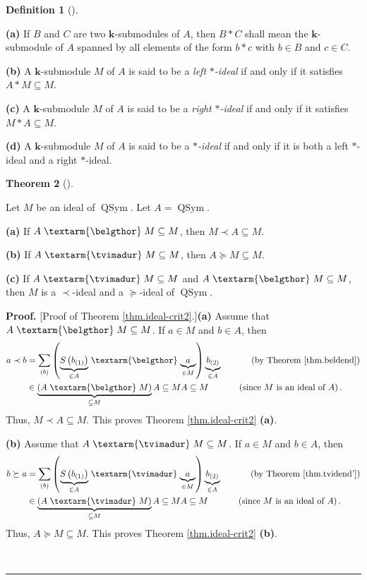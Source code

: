 \documentclass[numbers=enddot,12pt,final,onecolumn,notitlepage]{scrartcl}%
\theoremstyle{definition}
\newtheorem{theo}{Theorem}[section]
\newenvironment{theorem}[1][]
{\begin{theo}[#1]\begin{leftbar}}
{\end{leftbar}\end{theo}}
\newtheorem{defi}[theo]{Definition}
\newenvironment{definition}[1][]
{\begin{defi}[#1]\begin{leftbar}}
{\end{leftbar}\end{defi}}
\newenvironment{proof}[1][Proof]{\noindent\textbf{#1.} }{\ \rule{0.5em}{0.5em}}
\newenvironment{verlong}{}{}
\newcommand{\tvi}{\left. \textarm{\tvimadur} \right.}
\newcommand{\bel}{\left. \textarm{\belgthor} \right.}
\let\sumnonlimits\sum
\renewcommand{\sum}{\sumnonlimits\limits}
\begin{document}
\begin{verlong}
\begin{definition}
\textbf{(a)} If $B$ and $C$ are two $\mathbf{k}$-submodules of $A$, then
$B\ast C$ shall mean the $\mathbf{k}$-submodule of $A$ spanned by all elements
of the form $b\ast c$ with $b\in B$ and $c\in C$.

\textbf{(b)} A $\mathbf{k}$-submodule $M$ of $A$ is said to be a \textit{left
}$\ast$\textit{-ideal} if and only if it satisfies $A\ast M\subseteq M$.

\textbf{(c)} A $\mathbf{k}$-submodule $M$ of $A$ is said to be a \textit{right
}$\ast$\textit{-ideal} if and only if it satisfies $M\ast A\subseteq M$.

\textbf{(d)} A $\mathbf{k}$-submodule $M$ of $A$ is said to be a\textit{
}$\ast$\textit{-ideal} if and only if it is both a left $\ast$-ideal and a
right $\ast$-ideal.
\end{definition}

\begin{theorem}
\label{thm.ideal-crit2}Let $M$ be an ideal of $\operatorname*{QSym}$. Let
$A=\operatorname*{QSym}$.

\textbf{(a)} If $A\bel  M\subseteq M$, then $M\left.  \prec\right.  A\subseteq
M$.

\textbf{(b)} If $A\tvi  M\subseteq M$, then $A\left.  \succeq\right.
M\subseteq M$.

\textbf{(c)} If $A\tvi  M\subseteq M$ and $A\bel  M\subseteq M$, then $M$ is a
$\left.  \prec\right.  $-ideal and a $\left.  \succeq\right.  $-ideal of
$\operatorname*{QSym}$.
\end{theorem}

\begin{proof}
[Proof of Theorem \ref{thm.ideal-crit2}.]\textbf{(a)} Assume that
$A\bel  M\subseteq M$. If $a\in M$ and $b\in A$, then%
\begin{align*}
a\left.  \prec\right.  b  &  =\sum_{\left(  b\right)  }\left(
\underbrace{S\left(  b_{\left(  1\right)  }\right)  }_{\in A}%
\bel \underbrace{a}_{\in M}\right)  \underbrace{b_{\left(  2\right)  }}_{\in
A}\ \ \ \ \ \ \ \ \ \ \left(  \text{by Theorem \ref{thm.beldend}}\right) \\
&  \in\underbrace{\left(  A\bel M\right)  }_{\subseteq M}A\subseteq
MA\subseteq M\ \ \ \ \ \ \ \ \ \ \left(  \text{since }M\text{ is an ideal of
}A\right)  .
\end{align*}
Thus, $M\left.  \prec\right.  A\subseteq M$. This proves Theorem
\ref{thm.ideal-crit2} \textbf{(a)}.

\textbf{(b)} Assume that $A\tvi  M\subseteq M$. If $a\in M$ and $b\in A$, then%
\begin{align*}
b\left.  \succeq\right.  a  &  =\sum_{\left(  b\right)  }\left(
\underbrace{S\left(  b_{\left(  1\right)  }\right)  }_{\in A}%
\tvi \underbrace{a}_{\in M}\right)  \underbrace{b_{\left(  2\right)  }}_{\in
A}\ \ \ \ \ \ \ \ \ \ \left(  \text{by Theorem \ref{thm.tvidend'}}\right) \\
&  \in\underbrace{\left(  A\tvi M\right)  }_{\subseteq M}A\subseteq
MA\subseteq M\ \ \ \ \ \ \ \ \ \ \left(  \text{since }M\text{ is an ideal of
}A\right)  .
\end{align*}
Thus, $A\left.  \succeq\right.  M\subseteq M$. This proves Theorem
\ref{thm.ideal-crit2} \textbf{(b)}.


\end{proof}
\end{verlong}
\end{document}
